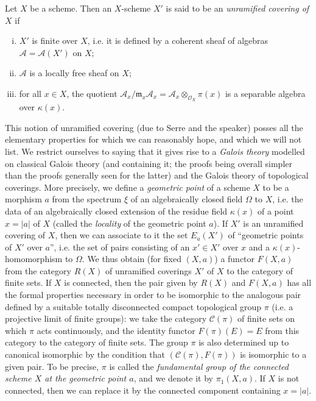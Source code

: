 \documentclass{article}
\theoremstyle{plain}
\theoremstyle{definition}
\newcommand{\sh}[1]{{\mathscr{#1}}}
\newcommand{\cat}[1]{{\mathcal{#1}}}
\newcommand{\fk}{\mathfrak}
\newcommand{\kres}{\kappa}
\newcommand{\oldpage}[1]{\marginpar{\footnotesize$\Big\vert$ \textit{p.~#1}}}
\begin{document}
Let $X$ be a scheme.
Then an $X$-scheme $X'$ is said to be an \emph{unramified covering of $X$}
\oldpage{182-18}
if
\begin{enumerate}[i.]
  \item $X'$ is finite over $X$, i.e. it is defined by a coherent sheaf of algebras $\sh{A}=\sh{A}(X')$ on $X$;
  \item $\sh{A}$ is a locally free sheaf on $X$;
  \item for all $x\in X$, the quotient $\sh{A}_x/\fk{m}_x\sh{A}_x = \sh{A}_x\otimes_{\sh{O}_X}\pi(x)$ is a separable algebra over $\kres(x)$.
\end{enumerate}

This notion of unramified covering (due to Serre and the speaker) posses all the elementary properties for which we can reasonably hope, and which we will not list.
We restrict ourselves to saying that it gives rise to a \emph{Galois theory} modelled on classical Galois theory (and containing it; the proofs being overall simpler than the proofs generally seen for the latter) and the Galois theory of topological coverings.
More precisely, we define a \emph{geometric point} of a scheme $X$ to be a morphism $a$ from the spectrum $\xi$ of an algebraically closed field $\Omega$ to $X$, i.e. the data of an algebraically closed extension of the residue field $\kres(x)$ of a point $x=|a|$ of $X$ (called the \emph{locality} of the geometric point $a$).
If $X'$ is an unramified covering of $X$, then we can associate to it the set $E_a(X')$ of ``geometric points of $X'$ over $a$'', i.e. the set of pairs consisting of an $x'\in X'$ over $x$ and a $\kres(x)$-homomorphism to $\Omega$.
We thus obtain (for fixed $(X,a)$) a functor $F(X,a)$ from the category $R(X)$ of unramified coverings $X'$ of $X$ to the category of finite sets.
If $X$ is connected, then the pair given by $R(X)$ and $F(X,a)$ has all the formal properties necessary in order to be isomorphic to the analogous pair defined by a suitable totally disconnected compact topological group $\pi$ (i.e. a projective limit of finite groups): we take the category $\cat{C}(\pi)$ of finite sets on which $\pi$ acts continuously, and the identity functor $F(\pi)(E)=E$ from this category to the category of finite sets.
The group $\pi$ is also determined up to canonical isomorphic by the condition that $(\cat{C}(\pi),F(\pi))$ is isomorphic to a given pair.
To be precise, $\pi$ is called the \emph{fundamental group of the connected scheme $X$ at the geometric point $a$}, and we denote it by $\pi_1(X,a)$.
If $X$ is not connected, then we can replace it by the connected component containing $x=|a|$.
\end{document}
